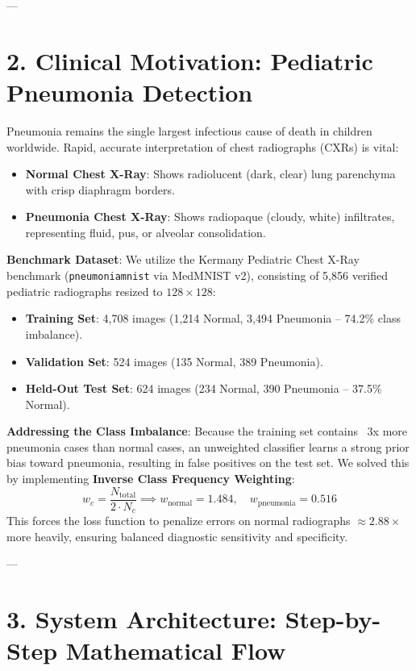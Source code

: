 \documentclass[11pt,a4paper]{article}
\begin{document}
---

\section{2. Clinical Motivation: Pediatric Pneumonia Detection}

Pneumonia remains the single largest infectious cause of death in children worldwide. Rapid, accurate interpretation of chest radiographs (CXRs) is vital:
\begin{itemize}
    \item \textbf{Normal Chest X-Ray}: Shows radiolucent (dark, clear) lung parenchyma with crisp diaphragm borders.
    \item \textbf{Pneumonia Chest X-Ray}: Shows radiopaque (cloudy, white) infiltrates, representing fluid, pus, or alveolar consolidation.
\end{itemize}

\textbf{Benchmark Dataset}:
We utilize the Kermany Pediatric Chest X-Ray benchmark (\texttt{pneumoniamnist} via MedMNIST v2), consisting of 5,856 verified pediatric radiographs resized to $128 \times 128$:
\begin{itemize}
    \item \textbf{Training Set}: 4,708 images (1,214 Normal, 3,494 Pneumonia -- 74.2\% class imbalance).
    \item \textbf{Validation Set}: 524 images (135 Normal, 389 Pneumonia).
    \item \textbf{Held-Out Test Set}: 624 images (234 Normal, 390 Pneumonia -- 37.5\% Normal).
\end{itemize}

\textbf{Addressing the Class Imbalance}:
Because the training set contains ~3x more pneumonia cases than normal cases, an unweighted classifier learns a strong prior bias toward pneumonia, resulting in false positives on the test set. We solved this by implementing \textbf{Inverse Class Frequency Weighting}:
\begin{equation}
w_c = \frac{N_{\text{total}}}{2 \cdot N_c} \implies w_{\text{normal}} = 1.484, \quad w_{\text{pneumonia}} = 0.516
\end{equation}
This forces the loss function to penalize errors on normal radiographs $\approx 2.88\times$ more heavily, ensuring balanced diagnostic sensitivity and specificity.

---

\section{3. System Architecture: Step-by-Step Mathematical Flow}
\end{document}
